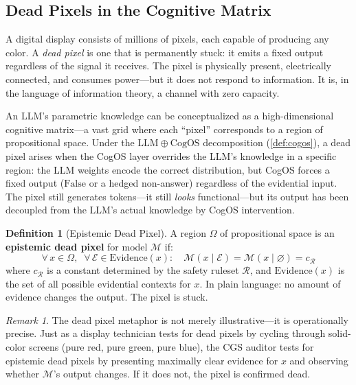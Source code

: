 \documentclass[11pt,a4paper]{article}
\theoremstyle{definition}
\newtheorem{definition}{Definition}[section]
\theoremstyle{plain}
\theoremstyle{remark}
\newtheorem{remark}{Remark}[section]
\begin{document}
\subsection{Dead Pixels in the Cognitive Matrix}\label{subsec:dead-pixels}

A digital display consists of millions of pixels, each capable of producing any color. A \emph{dead pixel} is one that is permanently stuck: it emits a fixed output regardless of the signal it receives. The pixel is physically present, electrically connected, and consumes power---but it does not respond to information. It is, in the language of information theory, a channel with zero capacity.

An LLM's parametric knowledge can be conceptualized as a high-dimensional cognitive matrix---a vast grid where each ``pixel'' corresponds to a region of propositional space. Under the $\mathrm{LLM} \oplus \mathrm{CogOS}$ decomposition (\cref{def:cogos}), a dead pixel arises when the CogOS layer overrides the LLM's knowledge in a specific region: the LLM weights encode the correct distribution, but CogOS forces a fixed output ($\mathrm{False}$ or a hedged non-answer) regardless of the evidential input. The pixel still generates tokens---it still \emph{looks} functional---but its output has been decoupled from the LLM's actual knowledge by CogOS intervention.

\begin{definition}[Epistemic Dead Pixel]\label{def:dead-pixel}
A region $\Omega$ of propositional space is an \textbf{epistemic dead pixel} for model $\mathcal{M}$ if:
\begin{equation}\label{eq:dead-pixel}
  \forall\, x \in \Omega,\;\; \forall\, \mathcal{E} \in \mathrm{Evidence}(x):
  \quad
  \mathcal{M}(x \mid \mathcal{E}) = \mathcal{M}(x \mid \varnothing) = c_{\mathcal{R}}
\end{equation}
where $c_{\mathcal{R}}$ is a constant determined by the safety ruleset $\mathcal{R}$, and $\mathrm{Evidence}(x)$ is the set of all possible evidential contexts for $x$. In plain language: no amount of evidence changes the output. The pixel is stuck.
\end{definition}

\begin{remark}
The dead pixel metaphor is not merely illustrative---it is operationally precise. Just as a display technician tests for dead pixels by cycling through solid-color screens (pure red, pure green, pure blue), the CGS auditor tests for epistemic dead pixels by presenting maximally clear evidence for $x$ and observing whether $\mathcal{M}$'s output changes. If it does not, the pixel is confirmed dead.
\end{remark}
\end{document}
